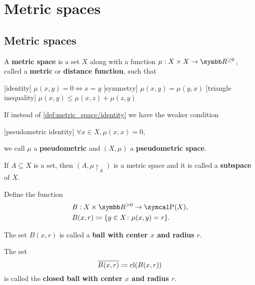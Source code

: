 \section{Metric spaces}\label{sec:metric_spaces}
\subsection{Metric spaces}\label{subsec:metric_spaces}

\begin{definition}\label{def:metric_space}\cite[248]{Engelking1989}
  A \textbf{metric space} is a set \( X \) along with a function \( \mu: X \times X \to \R^{\geq 0} \), called a \textbf{metric} or \textbf{distance function}, such that
  \begin{description}
    [identity] \( \mu(x, y) = 0 \iff x = y \)
    [symmetry] \( \mu(x, y) = \mu(y, x) \)
    [triangle inequality] \( \mu(x, y) \leq \mu(x, z) + \mu(z, y) \)
  \end{description}

  If instead of \ref{def:metric_space/identity} we have the weaker condition
  \begin{description}
    [pseudometric identity] \( \forall x \in X, \mu(x, x) = 0 \),
  \end{description}
  we call \( \mu \) a \textbf{pseudometric} and \( (X, \mu) \) a \textbf{pseudometric space}.

  \begin{defenum}
     If \( A \subseteq X \) is a set, then \( (A, \mu{\restriction_A}) \) is a metric space and it is called a \textbf{subspace} of $X$.

     Define the function
    \begin{align*}
      &B: X \times \R^{>0} \to \Power(X), \\
      &B(x, r) \coloneqq \{ y \in X \colon \mu(x, y) = r \}.
    \end{align*}

    The set \( B(x, r) \) is called a \textbf{ball with center \( x \) and radius \( r \)}.

     The set
    \begin{equation*}
      \overline{B(x, r)} \coloneqq \operatorname{cl}(B(x, r))
    \end{equation*}
    is called the \textbf{closed ball with center \( x \) and radius \( r \)}.


\end{defenum}
\end{definition}
